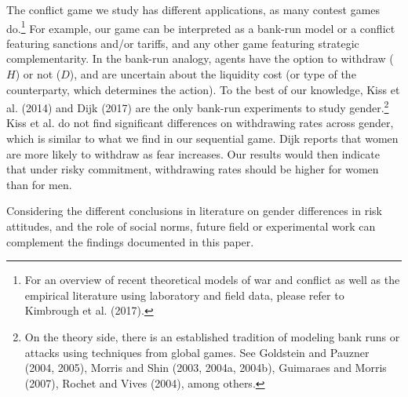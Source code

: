 \documentclass[11pt,english]{article}
\begin{document}
The conflict game we study has different applications, as many contest games do.\footnote{For an overview of recent theoretical models of war and conflict as well as the empirical literature using laboratory and field data, please refer to Kimbrough et al. (2017).}  For example, our game can be interpreted as a bank-run model or a conflict featuring sanctions and/or tariffs, and any other game featuring strategic complementarity. In the bank-run analogy, agents have the option to withdraw ($H$) or not ($D$), and are uncertain about the  liquidity cost (or type of the counterparty, which determines the action). To the best of our knowledge, Kiss et al. (2014) and Dijk (2017) are the only bank-run experiments to study gender.\footnote{On the theory side, there is an established tradition of modeling bank runs or attacks using techniques from global games. See Goldstein and Pauzner (2004, 2005), Morris and Shin (2003, 2004a, 2004b), Guimaraes and Morris (2007), Rochet and Vives (2004), among others.} Kiss et al. do not find significant differences on withdrawing rates across gender, which is similar to what we find in our sequential game.  Dijk reports that women are more likely to withdraw as fear increases. Our results would then indicate that under risky commitment, withdrawing rates should be higher for women than for men.

Considering the different conclusions in literature on gender differences in risk attitudes, and the role of social norms, future field or experimental work can complement the findings documented in this paper.

\end{document}
